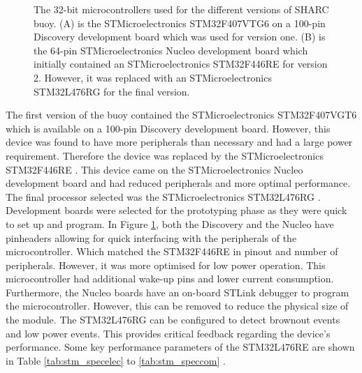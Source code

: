 \begin{figure}[H]
	\centering
	\begin{subfigure}[t]{.5\textwidth}
	\end{subfigure}
	\hfill
	\begin{subfigure}[t]{.49\textwidth}
	\end{subfigure}
	\hfill
	\caption{The 32-bit microcontrollers used for the different versions of SHARC buoy. (A) is the STMicroelectronics STM32F407VTG6 \cite{stmdisc} on a 100-pin Discovery development board which was used for version one. (B) is the 64-pin STMicroelectronics Nucleo development board which initially contained an STMicroelectronics STM32F446RE \cite{stm32nucleo} for version 2. However, it was replaced with an STMicroelectronics STM32L476RG \cite{stm32l4} for the final version.}
	\label{fig:mcus}
\end{figure}

The first version of the buoy contained the STMicroelectronics STM32F407VGT6 \cite{stmdisc} which is available on a 100-pin Discovery development board. However, this device was found to have more peripherals than necessary and had a large power requirement. Therefore the device was replaced by the STMicroelectronics STM32F446RE \cite{stm32nucleo}. This device came on the STMicroelectronics Nucleo development board and had reduced peripherals and more optimal performance. The final processor selected was the STMicroelectronics STM32L476RG \cite{stm32l4}. Development boards were selected for the prototyping phase as they were quick to set up and program. In Figure \ref{fig:mcus}, both the Discovery and the Nucleo have pinheaders allowing for quick interfacing with the peripherals of the microcontroller. Which matched the STM32F446RE in pinout and number of peripherals. However, it was more optimised for low power operation. This microcontroller had additional wake-up pins and lower current consumption. Furthermore, the Nucleo boards have an on-board STLink debugger to program the microcontroller. However, this can be removed to reduce the physical size of the module. The STM32L476RG can be configured to detect brownout events and low power events. This provides critical feedback regarding the device's performance. Some key performance parameters of the STM32L476RE are shown in Table \ref{tab:stm_specelec} to \ref{tab:stm_speccom} .

